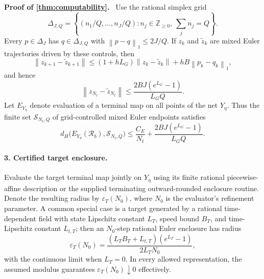 \documentclass[twoside,11pt]{article}
\renewenvironment{proof}[1][Proof]{\par\noindent\textbf{#1.}\ }{\hfill\BlackBox\par\medskip}
\newcommand{\norm}[1]{\left\lVert #1\right\rVert}
\newcommand{\RR}{\mathscr{R}}
\begin{document}
\begin{proof}[Proof of \cref{thm:computability}]
Use the rational simplex grid
\[
  \Delta_{J,Q}=\left\{(n_1/Q,\ldots,n_J/Q):n_j\in\mathbb Z_{\ge0},\ \sum_jn_j=Q\right\}.
\]
Every $p\in\Delta_J$ has $q\in\Delta_{J,Q}$ with $\norm{p-q}_1\le2J/Q$.  If $z_k$ and $\widetilde z_k$ are mixed Euler trajectories driven by these controls, then
\[
  \norm{z_{k+1}-\widetilde z_{k+1}}
  \le(1+hL_G)\norm{z_k-\widetilde z_k}
  +hB\norm{p_k-q_k}_1,
\]
and hence
\begin{equation}
  \norm{z_{N_t}-\widetilde z_{N_t}}
  \le \frac{2BJ(e^{L_G}-1)}{L_GQ}.
  \label{soft:eq:simplex-grid-error}
\end{equation}
Let $E_{Y_\eta}$ denote evaluation of a terminal map on all points of the net $Y_\eta$. Thus the finite set $\mathcal S_{N_t,Q}$ of grid-controlled mixed Euler endpoints satisfies
\begin{equation}
  d_H\bigl(E_{Y_\eta}(\RR_b),\mathcal S_{N_t,Q}\bigr)
  \le \frac{C_E}{N_t}+\frac{2BJ(e^{L_G}-1)}{L_GQ}.
  \label{soft:eq:finite-relaxed-approx}
\end{equation}

\paragraph{3. Certified target enclosure.}
Evaluate the target terminal map jointly on $Y_\eta$ using its finite rational
piecewise-affine description or the supplied terminating outward-rounded
enclosure routine.  Denote the resulting radius by $\varepsilon_T(N_0)$,
where $N_0$ is the evaluator's refinement parameter.  A common special case is
a target generated by a rational time-dependent field with state Lipschitz
constant $L_T$, speed bound $B_T$, and time-Lipschitz constant $L_{t,T}$; then
an $N_0$-step rational Euler enclosure has radius
\[
  \varepsilon_T(N_0)=\frac{(L_TB_T+L_{t,T})(e^{L_T}-1)}{2L_TN_0},
\]
with the continuous limit when $L_T=0$.  In every allowed representation,
the assumed modulus guarantees $\varepsilon_T(N_0)\downarrow0$ effectively.


\end{proof}
\end{document}
